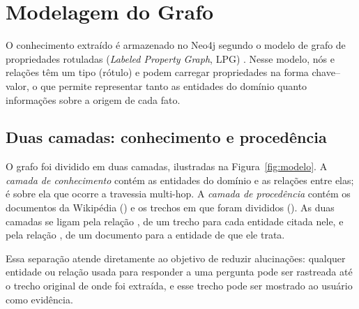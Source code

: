 %

\section{Modelagem do Grafo}
\label{sec:modelagem}

O conhecimento extraído é armazenado no Neo4j segundo o modelo de grafo de propriedades rotuladas (\emph{Labeled Property Graph}, LPG) \cite{angles2018pg,robinson2015graphdb}. Nesse modelo, nós e relações têm um tipo (rótulo) e podem carregar propriedades na forma chave--valor, o que permite representar tanto as entidades do domínio quanto informações sobre a origem de cada fato.

\subsection{Duas camadas: conhecimento e procedência}

O grafo foi dividido em duas camadas, ilustradas na Figura~\ref{fig:modelo}. A \emph{camada de conhecimento} contém as entidades do domínio e as relações entre elas; é sobre ela que ocorre a travessia multi-hop. A \emph{camada de procedência} contém os documentos da Wikipédia () e os trechos em que foram divididos (). As duas camadas se ligam pela relação , de um trecho para cada entidade citada nele, e pela relação , de um documento para a entidade de que ele trata.

Essa separação atende diretamente ao objetivo de reduzir alucinações: qualquer entidade ou relação usada para responder a uma pergunta pode ser rastreada até o trecho original de onde foi extraída, e esse trecho pode ser mostrado ao usuário como evidência.

